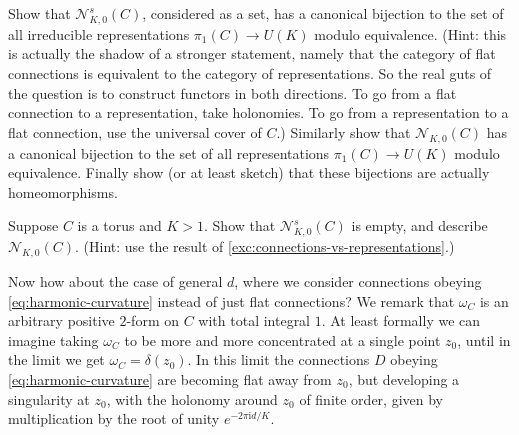 \documentclass[12pt,letterpaper,reqno]{article}
\numberwithin{equation}{section}
\newcommand{\cN}{\ensuremath{\mathcal N}}
\newcommand{\I}{{\mathrm i}}
\newcommand{\insfig}[2]{

\medskip
\noindent
\begin{minipage}{\linewidth}

\makebox[\linewidth]{\texttt{[image: figures/\#1-crop.pdf]}}

\end{minipage}
\medskip

}
\begin{document}
\begin{exercise} \label{exc:connections-vs-representations}
Show that $\cN_{K,0}^s(C)$, considered as a set,
has a canonical bijection to the set of all irreducible representations
$\pi_1(C) \to U(K)$ modulo equivalence. (Hint: this is actually the shadow
of a stronger statement, namely that the category of flat connections is
equivalent to the category of representations. So the real guts of the
question is to construct functors in both directions. To go from a flat
connection to a representation, take holonomies. To go from
a representation to a flat connection, use the universal cover of $C$.)
Similarly show that $\cN_{K,0}(C)$ has a canonical bijection to
the set of all representations
$\pi_1(C) \to U(K)$ modulo equivalence.
Finally show (or at least sketch) that
these bijections are actually homeomorphisms.
\end{exercise}

\begin{exercise} \label{exc:no-irreducible-connections-on-torus}
Suppose $C$ is a torus
and $K>1$. Show that $\cN_{K,0}^s(C)$ is empty, and describe $\cN_{K,0}(C)$.
(Hint: use the result
of \autoref{exc:connections-vs-representations}.)
\end{exercise}

Now how about the case of general $d$, where we consider
connections obeying \eqref{eq:harmonic-curvature} instead of
just flat connections?
We remark that $\omega_C$ is an arbitrary positive $2$-form
on $C$ with total integral $1$.
At least formally we can imagine taking $\omega_C$ to be more and more
concentrated at a single point $z_0$, until in the limit we get
$\omega_C = \delta(z_0)$. In this limit the connections $D$ obeying
\eqref{eq:harmonic-curvature} are becoming
flat away from $z_0$, but developing a singularity
at $z_0$, with the holonomy around $z_0$
of finite order, given by multiplication by the root of unity
$e^{-2 \pi \I d / K}$.

\insfig{higgs-bundles-13}{0.95}
\end{document}
